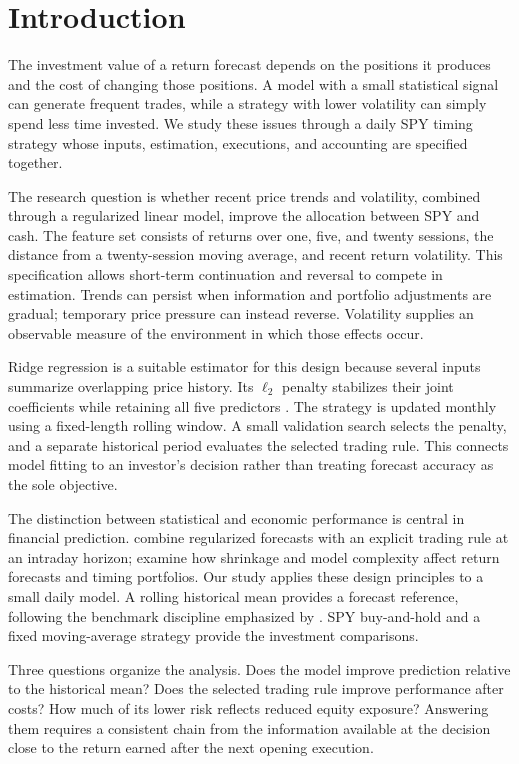\section{Introduction}
\label{sec:intro}
The investment value of a return forecast depends on the positions it produces and the cost of changing those positions. A model with a small statistical signal can generate frequent trades, while a strategy with lower volatility can simply spend less time invested. We study these issues through a daily SPY timing strategy whose inputs, estimation, executions, and accounting are specified together.

The research question is whether recent price trends and volatility, combined through a regularized linear model, improve the allocation between SPY and cash. The feature set consists of returns over one, five, and twenty sessions, the distance from a twenty-session moving average, and recent return volatility. This specification allows short-term continuation and reversal to compete in estimation. Trends can persist when information and portfolio adjustments are gradual; temporary price pressure can instead reverse. Volatility supplies an observable measure of the environment in which those effects occur.

Ridge regression is a suitable estimator for this design because several inputs summarize overlapping price history. Its $\ell_2$ penalty stabilizes their joint coefficients while retaining all five predictors \citep{hoerl1970ridge}. The strategy is updated monthly using a fixed-length rolling window. A small validation search selects the penalty, and a separate historical period evaluates the selected trading rule. This connects model fitting to an investor's decision rather than treating forecast accuracy as the sole objective.

The distinction between statistical and economic performance is central in financial prediction. \citet{chinco2019sparse} combine regularized forecasts with an explicit trading rule at an intraday horizon; \citet{kelly2024virtue} examine how shrinkage and model complexity affect return forecasts and timing portfolios. Our study applies these design principles to a small daily model. A rolling historical mean provides a forecast reference, following the benchmark discipline emphasized by \citet{campbell2008predicting}. SPY buy-and-hold and a fixed moving-average strategy provide the investment comparisons.

Three questions organize the analysis. Does the model improve prediction relative to the historical mean? Does the selected trading rule improve performance after costs? How much of its lower risk reflects reduced equity exposure? Answering them requires a consistent chain from the information available at the decision close to the return earned after the next opening execution.

